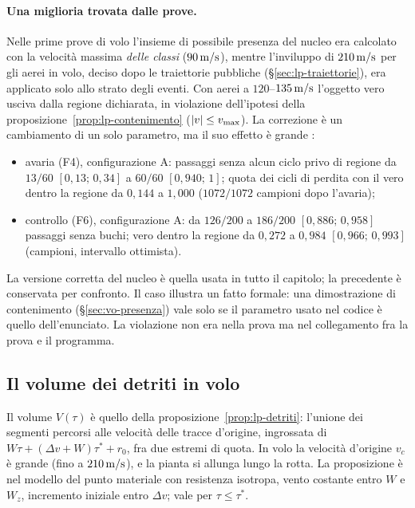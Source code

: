 \paragraph{Una miglioria trovata dalle prove.} Nelle prime prove di volo l'insieme di possibile presenza del nucleo era calcolato con la velocità massima \emph{delle classi} ($90\,\mathrm{m/s}$), mentre l'inviluppo di $210\,\mathrm{m/s}$ per gli aerei in volo, deciso dopo le traiettorie pubbliche (\S\ref{sec:lp-traiettorie}), era applicato solo allo strato degli eventi. Con aerei a $120$--$135\,\mathrm{m/s}$ l'oggetto vero usciva dalla regione dichiarata, in violazione dell'ipotesi della proposizione~\ref{prop:lp-contenimento} ($|v|\le v_{\max}$). La correzione è un cambiamento di un solo parametro, ma il suo effetto è grande :
\begin{itemize}
\item avaria (F4), configurazione A: passaggi senza alcun ciclo privo di regione da $13/60$ $[0{,}13;\,0{,}34]$ a $60/60$ $[0{,}940;\,1]$; quota dei cicli di perdita con il vero dentro la regione da $0{,}144$ a $1{,}000$ ($1072/1072$ campioni dopo l'avaria);
\item controllo (F6), configurazione A: da $126/200$ a $186/200$ $[0{,}886;\,0{,}958]$ passaggi senza buchi; vero dentro la regione da $0{,}272$ a $0{,}984$ $[0{,}966;\,0{,}993]$ (campioni, intervallo ottimista).
\end{itemize}
La versione corretta del nucleo è quella usata in tutto il capitolo; la precedente è conservata per confronto. Il caso illustra un fatto formale: una dimostrazione di contenimento (\S\ref{sec:vo-presenza}) vale solo se il parametro usato nel codice è quello dell'enunciato. La violazione non era nella prova ma nel collegamento fra la prova e il programma.

\subsection{Il volume dei detriti in volo}\label{sec:vo-detriti}

Il volume $V(\tau)$ è quello della proposizione~\ref{prop:lp-detriti}: l'unione dei segmenti percorsi alle velocità delle tracce d'origine, ingrossata di $W\tau+(\Delta v+W)\tau^*+r_0$, fra due estremi di quota. In volo la velocità d'origine $v_c$ è grande (fino a $210\,\mathrm{m/s}$), e la pianta si allunga lungo la rotta. La proposizione è  nel modello del punto materiale con resistenza isotropa, vento costante entro $W$ e $W_z$, incremento iniziale entro $\Delta v$; vale per $\tau\le\tau^*$.

